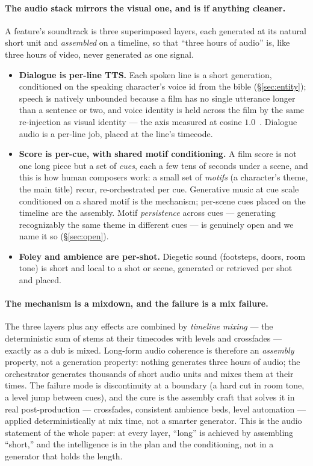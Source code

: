 \documentclass[11pt]{article}
\begin{document}
\paragraph{The audio stack mirrors the visual one, and is if anything cleaner.} A feature's soundtrack is three
superimposed layers, each generated at its natural short unit and \emph{assembled} on a timeline, so that ``three
hours of audio'' is, like three hours of video, never generated as one signal.
\begin{itemize}[leftmargin=1.4em,itemsep=2pt]
\item \textbf{Dialogue is per-line TTS.} Each spoken line is a short generation, conditioned on the speaking
character's voice id from the bible (\S\ref{sec:entity}); speech is natively unbounded because a film has no
single utterance longer than a sentence or two, and voice identity is held across the film by the same
re-injection as visual identity --- the axis measured at cosine $1.0$~\cite{games}. Dialogue audio is a per-line
job, placed at the line's timecode.
\item \textbf{Score is per-cue, with shared motif conditioning.} A film score is not one long piece but a set of
\emph{cues}, each a few tens of seconds under a scene, and this is how human composers work: a small set of
\emph{motifs} (a character's theme, the main title) recur, re-orchestrated per cue. Generative music at cue
scale~\cite{acestep} conditioned on a shared motif is the mechanism; per-scene cues placed on the timeline are
the assembly. Motif \emph{persistence} across cues --- generating recognizably the same theme in different cues
--- is genuinely open and we name it so (\S\ref{sec:open}).
\item \textbf{Foley and ambience are per-shot.} Diegetic sound (footsteps, doors, room tone) is short and local
to a shot or scene, generated or retrieved per shot and placed.
\end{itemize}

\paragraph{The mechanism is a mixdown, and the failure is a mix failure.} The three layers plus any effects are
combined by \emph{timeline mixing} --- the deterministic sum of stems at their timecodes with levels and
crossfades --- exactly as a dub is mixed. Long-form audio coherence is therefore an \emph{assembly} property, not
a generation property: nothing generates three hours of audio; the orchestrator generates thousands of short
audio units and mixes them at their times. The failure mode is discontinuity at a boundary (a hard cut in room
tone, a level jump between cues), and the cure is the assembly craft that solves it in real post-production ---
crossfades, consistent ambience beds, level automation --- applied deterministically at mix time, not a smarter
generator. This is the audio statement of the whole paper: at every layer, ``long'' is achieved by assembling
``short,'' and the intelligence is in the plan and the conditioning, not in a generator that holds the length.
\end{document}
